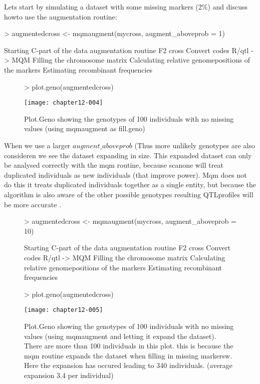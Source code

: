 \documentclass[11pt]{article}
\begin{document}
Lets start by simulating a dataset with some missing markers (2\%) and discuss howto use the augmentation routine:
\begin{Schunk}
\begin{Sinput}
> augmentedcross <- mqmaugment(mycross, augment_aboveprob = 1)
\end{Sinput}
\begin{Soutput}
Starting C-part of the data augmentation routine
F2 cross
Convert codes R/qtl -> MQM
Filling the chromosome matrix
Calculating relative genomepositions of the markers
Estimating recombinant frequencies
\end{Soutput}
\end{Schunk}
\clearpage
\begin{figure}[ht]
\begin{Schunk}
\begin{Sinput}
> plot.geno(augmentedcross)
\end{Sinput}
\end{Schunk}
\texttt{[image: chapter12-004]}
\caption{Plot.Geno showing the genotypes of 100 individuals with no missing values (using mqmaugment as fill.geno)}
\end{figure}
When we use a larger $augment\_aboveprob$ (Thus more unlikely genotypes are also consideren we see the dataset expanding in size.
This expanded dataset can only be analysed correctly with the mqm routine, because scanone will treat duplicated individuals
as new individuals (that improve power)\cite{Dempster77}. Mqm does not do this it treats duplicated individuals together as a single entity, but because the algorithm is also aware of the other possible genotypes resulting QTLprofiles will be more accurate \cite{jansen93}.
\\
\begin{figure}[ht]
\begin{Schunk}
\begin{Sinput}
> augmentedcross <- mqmaugment(mycross, augment_aboveprob = 10)
\end{Sinput}
\begin{Soutput}
Starting C-part of the data augmentation routine
F2 cross
Convert codes R/qtl -> MQM
Filling the chromosome matrix
Calculating relative genomepositions of the markers
Estimating recombinant frequencies
\end{Soutput}
\begin{Sinput}
> plot.geno(augmentedcross)
\end{Sinput}
\end{Schunk}
\texttt{[image: chapter12-005]}
\caption{Plot.Geno showing the genotypes of 100 individuals with no missing values (using mqmaugment and letting it expand the dataset). There are more than 100 individuals in this plot. this is because the mqm routine expands the dataset when filling in missing markersw. Here the expansion has occured leading to 340 individuals. (average expansion 3.4 per individual)}
\end{figure}
\clearpage
\end{document}
